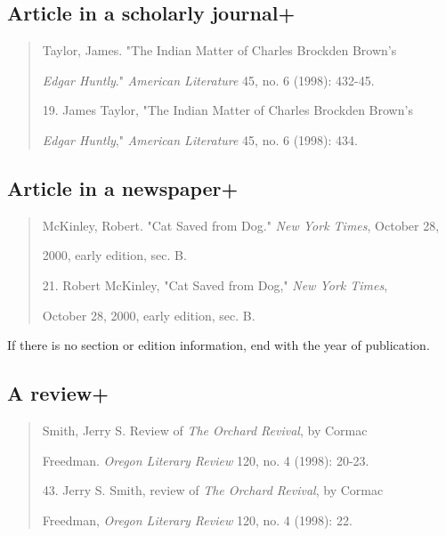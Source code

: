 \subsection{Article in a scholarly journal+}
\begin{quote}
Taylor, James. "The Indian Matter of Charles Brockden Brown's

\hspace{.4in}\emph{Edgar Huntly}." \emph{American Literature} 45, no. 6 (1998): 432-45.

\medskip

\hspace{.4in}19. James Taylor, "The Indian Matter of Charles Brockden Brown's 

\emph{Edgar Huntly}," \emph{American Literature} 45, no. 6 (1998): 434.

\end{quote}

\subsection{Article in a newspaper+}
\begin{quote}
McKinley, Robert. "Cat Saved from Dog." \emph{New York Times}, October 28, 

\hspace{.4in}2000, early edition, sec. B.

\medskip

\hspace{.4in}21. Robert McKinley, "Cat Saved from Dog," \emph{New York Times}, 

October 28, 2000, early edition, sec. B.

\end{quote}

 If there is no section or edition information, end with the year of publication.

\subsection{A review+}
\begin{quote}

Smith, Jerry S. Review of \emph{The Orchard Revival}, by Cormac 

\hspace{.4in}Freedman. \emph{Oregon Literary Review} 120, no. 4 (1998): 20-23.

\medskip

\hspace{.4in}43. Jerry S. Smith, review of \emph{The Orchard Revival}, by Cormac 

Freedman, \emph{Oregon Literary Review} 120, no. 4 (1998): 22.
\end{quote}

